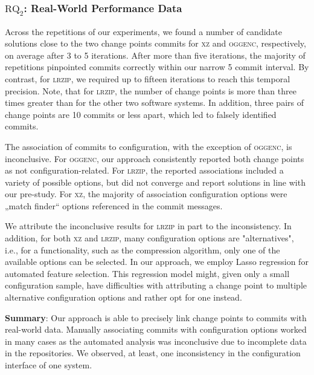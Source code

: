 \documentclass[sigconf]{acmart}
\newcommand{\greybox}[1]{
	\begin{mdframed}[backgroundcolor=black!10!white,linewidth=0pt,backgroundcolor=black!10,linewidth=0pt,innerleftmargin=5pt,innertopmargin=5pt]
		#1
	\end{mdframed}
}
\begin{document}
	\subsubsection{$\text{RQ}_2$: Real-World Performance Data}
	Across the repetitions of our experiments, we found a number of candidate solutions close to the two change points commits for \textsc{xz} and \textsc{oggenc}, respectively, on average after 3 to 5 iterations. After more than five iterations, the majority of repetitions pinpointed commits correctly within our narrow 5 commit interval. By contrast, for \textsc{lrzip}, we required up to fifteen iterations to reach this temporal precision. Note, that for \textsc{lrzip}, the number of change points is more than three times greater than for the other two software systems. In addition, three pairs of change points are 10 commits or less apart, which led to falsely identified commits. 
	
	The association of commits to configuration, with the exception of \textsc{oggenc}, is inconclusive. For \textsc{oggenc}, our approach consistently reported both change points as not configuration-related. For \textsc{lrzip}, the reported associations included a variety of possible options, but did not converge and report solutions in line with our pre-study. For \textsc{xz}, the majority of association configuration options were „match finder“ options referenced in the commit messages.
	
	We attribute the inconclusive results for \textsc{lrzip} in part to the inconsistency. In addition, for both \textsc{xz} and \textsc{lrzip}, many configuration options are "alternatives", i.e., for a functionality, such as the compression algorithm, only one of the available options can be selected. In our approach, we employ Lasso regression for automated feature selection. This regression model might, given only a small configuration sample, have difficulties with attributing a change point to multiple alternative configuration options and rather opt for one instead.  %
	\vspace{2mm}
	\greybox{
		\textbf{Summary}: Our approach is able to precisely link change points to commits with real-world data. Manually associating commits with configuration options worked in many cases as the automated analysis was inconclusive due to incomplete data in the repositories. We observed, at least, one inconsistency in the configuration interface of one system.
	}
	
\end{document}
